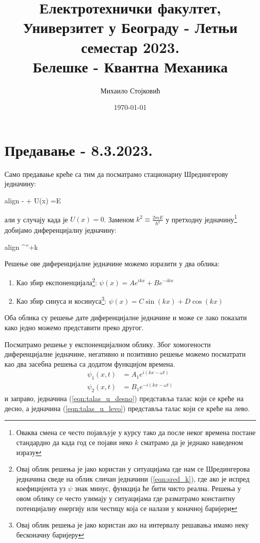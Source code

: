 \documentclass{tufte-handout} %
\title{	
	\normalfont\normalsize 
	{Електротехнички факултет, Универзитет у Београду - Летњи семестар 2023.} \\ [0pt] %
	\huge Белешке - Квантна Механика%
}\author{Михаило Стојковић} %
\date{\vspace{-5pt}\normalsize\today} %
\newcommand{\boxedeq}[1]{\begin{empheq}[box={\fboxsep=6pt\fbox}]{align} #1\end{empheq}}
\theoremstyle{definition}
\theoremstyle{remark}
\newcommand{\shreq}[2]{-\frac{\hbar^2}{2m}\frac{\partial^2 #1}{\partial #2^2} + U(#2) #1 =E #1}
\newcommand{\kpsi}{\psi^{''}+k\psi=0}
\begin{document}
\justifying 
\maketitle

\tableofcontents


\section{Предавање - 8.3.2023.}
Само предавање креће са тим да посматрамо стационарну Шредингерову једначину:
	\boxedeq{\shreq{\psi}{x}}
али у случају када је $U(x)=0$. Заменом $k^2\equiv\frac{2mE}{\hbar^2}$ у претходну једначину\footnote{Оваква смена се често појављује у курсу тако да после неког времена постане стандардно да када год се појави неко $k$ сматрамо да је једнако наведеном изразу} добијамо диференцијалну једначину:
	\boxedeq{\label{eqn:sred_k}\kpsi}
Решење ове диференцијалне једначине можемо изразити у два облика:
\begin{enumerate}
	\item Као збир експоненцијала\footnote{Овај облик решења је јако користан у ситуацијама где нам се Шредингерова једначина сведе на облик сличан једначини (\ref{eqn:sred_k}), где ако је испред коефицијента уз $\psi$ знак минус, функција ће бити чисто реална. Решења у овом облику се често узимају у ситуацијама где разматрамо константну потенцијалну енергију или честицу која се налази у коначној баријери}: $\psi(x)=Ae^{ikx} + Be^{-ikx}$
	\item Као збир синуса и косинуса\footnote{Овај облик решења је јако користан ако на интервалу решавања имамо неку бесконачну баријеру}: $\psi(x)=C\sin(kx)+D\cos(kx)$
\end{enumerate}
Оба облика су решење дате диференцијалне једначине и може се лако показати како једно можемо представити преко другог.\par
Посматрамо решење у експоненцијалном облику. Због хомогености диференцијалне једначине, негативно и позитивно решење можемо посматрати као два засебна решења са додатом функцијом времена.
\begin{align}
	\label{eqn:talas_u_desno}\psi_1(x,t)&=A_1e^{i(kx-\omega t)}\\
	\label{eqn:talas_u_levo}\psi_2(x,t)&=B_1e^{-i(kx-\omega t)} 
\end{align}
и заправо, једначина (\ref{eqn:talas_u_desno}) представља талас који се креће на десно, а једначина (\ref{eqn:talas_u_levo}) представља талас који се креће на лево.
\end{document}
